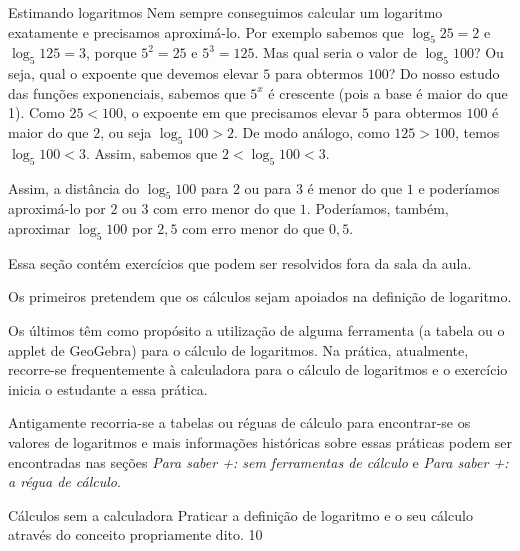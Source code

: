 \begin{example}{Estimando logaritmos}
Nem sempre conseguimos calcular um logaritmo exatamente e precisamos aproximá-lo. Por exemplo sabemos que $\log_5 25 = 2$ e $\log_5 125 = 3$, porque $5^2=25$ e $5^3 = 125$. Mas qual seria o valor de $\log_5 100$? Ou seja, qual o expoente que devemos elevar $5$ para obtermos $100$? Do nosso estudo das funções exponenciais, sabemos que $5^x$ é crescente (pois a base é maior do que 1). Como $25 < 100$, o expoente em que precisamos elevar $5$ para obtermos $100$ é maior do que $2$, ou seja $\log_5 100 >2$. De modo análogo, como $125 > 100$, temos $\log_5 100<3$. Assim, sabemos que $2<\log_5 100<3$.

\begin{figure}[H]
\centering

\end{figure}

Assim, a distância do $\log_5 100$ para $2$ ou para $3$ é menor do que $1$ e poderíamos aproximá-lo por $2$ ou $3$ com erro menor do que $1$. Poderíamos, também, aproximar $\log_5 100$ por $2{,}5$ com erro menor do que $0{,}5$. 
\end{example}


\def\currentcolor{session2}
\begin{texto}
{

Essa seção contém exercícios que podem ser resolvidos fora da sala da aula.

Os primeiros pretendem que os cálculos sejam apoiados na definição de logaritmo.

Os últimos têm como propósito a utilização de alguma ferramenta (a tabela ou o applet de GeoGebra) para o cálculo de logaritmos. Na prática, atualmente, recorre-se frequentemente à calculadora para o cálculo de logaritmos e o exercício inicia o estudante a essa prática.

Antigamente recorria-se a tabelas ou réguas de cálculo para encontrar-se os valores de logaritmos e mais informações históricas sobre essas práticas podem ser encontradas nas seções \textit{Para saber +: sem ferramentas de cálculo} e \textit{Para saber +: a régua de cálculo}.
}
\end{texto}
\begin{objectives}{Cálculos sem a calculadora}
{
Praticar a definição de logaritmo e o seu cálculo através do conceito propriamente dito.
}{1}{0}
\end{objectives}

